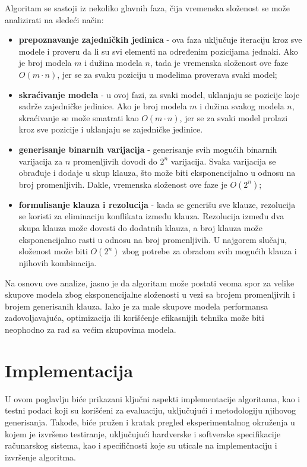 \documentclass[12pt,oneside]{memoir}
\begin{document}
Algoritam se sastoji iz nekoliko glavnih faza, čija vremenska složenost se može analizirati na sledeći način:

\begin{itemize}
    \item \textbf{prepoznavanje zajedničkih jedinica} - ova faza uključuje iteraciju kroz sve modele i proveru da li su svi elementi na određenim pozicijama jednaki. Ako je broj modela \( m \) i dužina modela \( n \), tada je vremenska složenost ove faze \( O(m \cdot n) \), jer se za svaku poziciju u modelima proverava svaki model;
    
    \item \textbf{skraćivanje modela} - u ovoj fazi, za svaki model, uklanjaju se pozicije koje sadrže zajedničke jedinice. Ako je broj modela \( m \) i dužina svakog modela \( n \), skraćivanje se može smatrati kao \( O(m \cdot n) \), jer se za svaki model prolazi kroz sve pozicije i uklanjaju se zajedničke jedinice.
    
    \item \textbf{generisanje binarnih varijacija} - generisanje svih mogućih binarnih varijacija za \( n \) promenljivih dovodi do \( 2^n \) varijacija. Svaka varijacija se obrađuje i dodaje u skup klauza, što može biti eksponencijalno u odnosu na broj promenljivih. Dakle, vremenska složenost ove faze je \( O(2^n) \);
    
    \item \textbf{formulisanje klauza i rezolucija} - kada se generišu sve klauze, rezolucija se koristi za eliminaciju konflikata između klauza. Rezolucija između dva skupa klauza može dovesti do dodatnih klauza, a broj klauza može eksponencijalno rasti u odnosu na broj promenljivih. U najgorem slučaju, složenost može biti \( O(2^n) \) zbog potrebe za obradom svih mogućih klauza i njihovih kombinacija.
\end{itemize}

Na osnovu ove analize, jasno je da algoritam može postati veoma spor za velike skupove modela zbog eksponencijalne složenosti u vezi sa brojem promenljivih i brojem generisanih klauza. Iako je za male skupove modela performansa zadovoljavajuća, optimizacija ili korišćenje efikasnijih tehnika može biti neophodno za rad sa većim skupovima modela.

\chapter{Implementacija}
U ovom poglavlju biće prikazani ključni aspekti implementacije algoritama, kao i testni podaci koji su korišćeni za evaluaciju, uključujući i metodologiju njihovog generisanja. Takođe, biće pružen i kratak pregled eksperimentalnog okruženja u kojem je izvršeno testiranje, uključujući hardverske i softverske specifikacije računarskog sistema, kao i specifičnosti koje su uticale na implementaciju i izvršenje algoritma.
\end{document}
